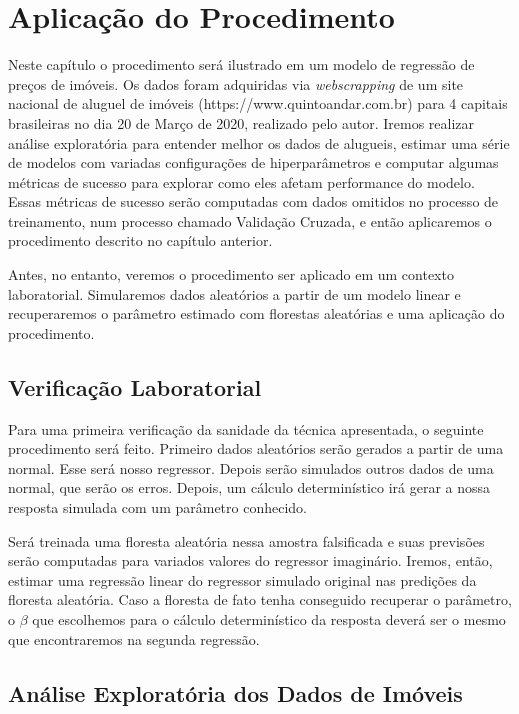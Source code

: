 

\chapter{Aplicação do Procedimento}

Neste capítulo o procedimento será ilustrado em um modelo de regressão de preços de imóveis. Os dados foram adquiridas via \textit{webscrapping} de um site nacional de aluguel de imóveis (https://www.quintoandar.com.br) para 4 capitais brasileiras no dia 20 de Março de 2020, realizado pelo autor. Iremos realizar análise exploratória para entender melhor os dados de alugueis, estimar uma série de modelos com variadas configurações de hiperparâmetros e computar algumas métricas de sucesso para explorar como eles afetam performance do modelo. Essas métricas de sucesso serão computadas com dados omitidos no processo de treinamento, num processo chamado Validação Cruzada, e então aplicaremos o procedimento descrito no capítulo anterior. 


Antes, no entanto, veremos o procedimento ser aplicado em um contexto laboratorial. Simularemos dados aleatórios a partir de um modelo linear e recuperaremos o parâmetro estimado com florestas aleatórias e uma aplicação do procedimento. 



\section{Verificação Laboratorial}

Para uma primeira verificação da sanidade da técnica apresentada, o seguinte procedimento será feito. Primeiro dados aleatórios serão gerados a partir de uma normal. Esse será nosso regressor. Depois serão simulados outros dados de uma normal, que serão os erros. Depois, um cálculo determinístico irá gerar a nossa resposta simulada com um parâmetro conhecido. 

Será treinada uma floresta aleatória nessa amostra falsificada e suas previsões serão computadas para variados valores do regressor imaginário. Iremos, então, estimar uma regressão linear do regressor simulado original nas predições da floresta aleatória. Caso a floresta de fato tenha conseguido recuperar o parâmetro, o $\beta$ que escolhemos para o cálculo determinístico da resposta deverá ser o mesmo que encontraremos na segunda regressão.





\section{Análise Exploratória dos Dados de Imóveis}

